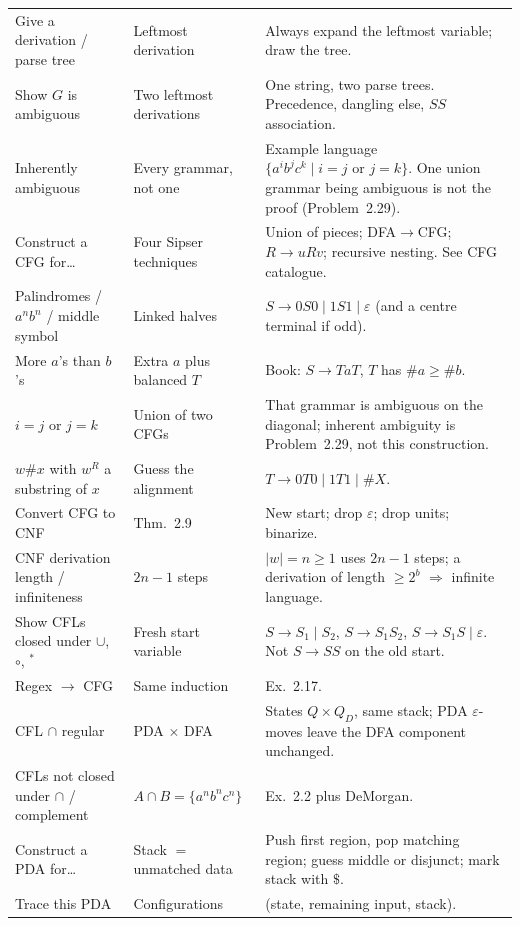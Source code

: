 \documentclass[11pt,a4paper]{article}
\newcommand{\eps}{\varepsilon}
\begin{document}
{\begin{longtable}{@{}>{\raggedright\arraybackslash}p{}
                    >{\raggedright\arraybackslash}p{}
                    >{\raggedright\arraybackslash}p{}@{}}
Give a derivation / parse tree
  & Leftmost derivation
  & Always expand the leftmost variable; draw the tree. \\
Show $G$ is ambiguous
  & Two leftmost derivations
  & One string, two parse trees. Precedence, dangling else,
    $SS$ association. \\
Inherently ambiguous
  & Every grammar, not one
  & Example language $\{a^ib^jc^k\mid i=j\text{ or }j=k\}$.
    One union grammar being ambiguous is not the proof
    (Problem~2.29). \\
Construct a CFG for\ldots
  & Four Sipser techniques
  & Union of pieces; DFA$\to$CFG; $R\to uRv$; recursive
    nesting. See CFG catalogue. \\
Palindromes / $a^nb^n$ / middle symbol
  & Linked halves
  & $S\to 0S0\mid 1S1\mid\eps$ (and a centre terminal if odd). \\
More $a$'s than $b$'s
  & Extra $a$ plus balanced $T$
  & Book: $S\to TaT$, $T$ has $\#a\ge\#b$. \\
$i=j$ or $j=k$
  & Union of two CFGs
  & That grammar is ambiguous on the diagonal; inherent
    ambiguity is Problem~2.29, not this construction. \\
$w\#x$ with $w^R$ a substring of $x$
  & Guess the alignment
  & $T\to 0T0\mid 1T1\mid\#X$. \\
Convert CFG to CNF
  & Thm.~2.9
  & New start; drop $\eps$; drop units; binarize. \\
CNF derivation length / infiniteness
  & $2n-1$ steps
  & $|w|=n\ge 1$ uses $2n-1$ steps; a derivation of length
    $\ge 2^b$ $\Rightarrow$ infinite language. \\
Show CFLs closed under $\cup$, $\circ$, ${}^*$
  & Fresh start variable
  & $S\to S_1\mid S_2$, $S\to S_1S_2$, $S\to S_1S\mid\eps$.
    Not $S\to SS$ on the old start. \\
Regex $\to$ CFG
  & Same induction
  & Ex.~2.17. \\
CFL $\cap$ regular
  & PDA $\times$ DFA
  & States $Q\times Q_D$, same stack; PDA $\eps$-moves leave
    the DFA component unchanged. \\
CFLs not closed under $\cap$ / complement
  & $A\cap B=\{a^nb^nc^n\}$
  & Ex.~2.2 plus DeMorgan. \\
Construct a PDA for\ldots
  & Stack $=$ unmatched data
  & Push first region, pop matching region; guess middle or
    disjunct; mark stack with $\$$. \\
Trace this PDA
  & Configurations
  & (state, remaining input, stack). \\

\end{longtable}}
\end{document}
